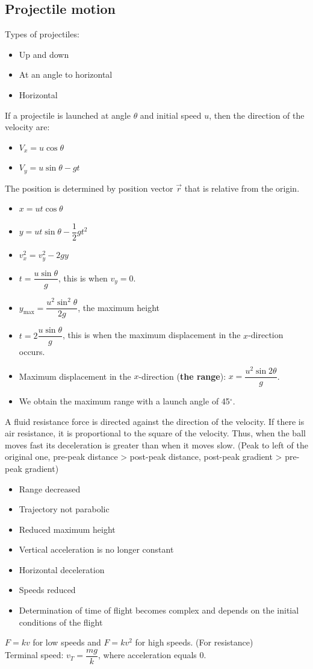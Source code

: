 \documentclass[a4paper,12pt]{article}
\begin{document}
\subsection{Projectile motion}
Types of projectiles:
\begin{itemize}
\item Up and down
\item At an angle to horizontal
\item Horizontal
\end{itemize}
If a projectile is launched at angle $\theta$ and initial speed $u$, then the direction of the velocity are:
\begin{itemize}
  \item $V_x=u\cos\theta$
  \item $V_y=u\sin\theta-gt$
\end{itemize}
The position is determined by position vector $\vec{r}$ that is relative from the origin.
\begin{itemize}
  \item $x=ut\cos\theta$
  \item $y=ut\sin\theta-\dfrac{1}{2}gt^2$
  \item $v_x^2=v_y^2-2gy$
  \item $t=\dfrac{u\sin\theta}{g}$, this is when $v_y=0$.
  \item $y_{\text{max}}=\dfrac{u^2\sin^2\theta}{2g}$, the maximum height
  \item $t=2\dfrac{u\sin\theta}{g}$, this is when the maximum displacement in the $x$-direction occurs.
  \item Maximum displacement in the $x$-direction (\textbf{the range}): $x=\dfrac{u^2\sin 2\theta}{g}$. 
\item We obtain the maximum range with a launch angle of 45$^\circ$.
\end{itemize}
A fluid resistance force is directed against the direction of the velocity. If there is air resistance, it is proportional to the square of the velocity. Thus, when the ball moves fast its deceleration is greater than when it moves slow. (Peak to left of the original one, pre-peak distance > post-peak distance, post-peak gradient > pre-peak gradient)
\begin{itemize}
\item Range decreased
\item Trajectory not parabolic
\item Reduced maximum height
\item Vertical acceleration is no longer constant
\item Horizontal deceleration
\item Speeds reduced
\item Determination of time of flight becomes complex and depends on the initial conditions of the flight
\end{itemize}
$F=kv$ for low speeds and $F=kv^2$ for high speeds. (For resistance)\\
Terminal speed: $v_T=\dfrac{mg}{k}$, where acceleration equals 0.
\end{document}
